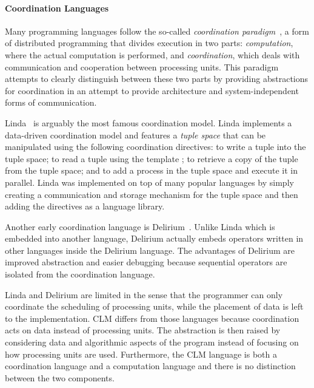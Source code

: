 \paragraph{Coordination Languages}
Many programming languages follow the so-called \emph{coordination
paradigm}~\cite{Papadopoulos98coordinationmodels}, a form of distributed
programming that divides execution in two parts: \emph{computation}, where the actual
computation is performed, and \emph{coordination}, which deals with
communication and cooperation between processing units. This paradigm attempts
to clearly distinguish between these two parts by providing abstractions for
coordination in an attempt to provide architecture and system-independent forms
of communication.  

Linda~\cite{linda} is arguably the most famous coordination model. Linda
implements a data-driven coordination model and features a \emph{tuple space}
that can be manipulated using the following coordination directives:
 to write a tuple  into the tuple space; 
to read a tuple using the template ;  to retrieve a copy
of the tuple  from the tuple space; and  to add a
process  in the tuple space and execute it in parallel.  Linda was
implemented on top of many popular languages by simply creating a communication
and storage mechanism for the tuple space and then adding the directives as a
language library.

Another early coordination language is Delirium~\cite{Delirium}. Unlike Linda
which is embedded into another language, Delirium actually embeds operators
written in other languages inside the Delirium language.  The advantages of
Delirium are improved abstraction and easier debugging because sequential
operators are isolated from the coordination language.

Linda and Delirium are limited in the sense that the programmer can only
coordinate the scheduling of processing units, while the placement of data is
left to the implementation. CLM differs from those
languages because coordination acts on data instead of processing units.
The abstraction is then raised by considering data and algorithmic aspects of
the program instead of focusing on how processing units are used.
Furthermore, the CLM language is both a coordination language and a computation
language and there is no distinction between the two components.

